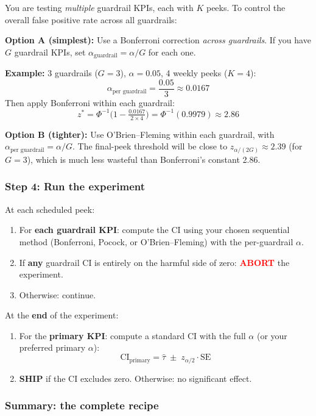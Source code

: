 \documentclass[12pt, a4paper]{article}
\begin{document}
You are testing \emph{multiple} guardrail KPIs, each with $K$ peeks.  To
control the overall false positive rate across all guardrails:

\textbf{Option A (simplest):}  Use a Bonferroni correction \emph{across
guardrails}.  If you have $G$ guardrail KPIs, set
$\alpha_{\text{guardrail}} = \alpha / G$ for each one.

\textbf{Example:} 3 guardrails ($G = 3$), $\alpha = 0.05$, 4 weekly peeks
($K = 4$):
\[
  \alpha_{\text{per guardrail}} = \frac{0.05}{3} \approx 0.0167
\]
Then apply Bonferroni within each guardrail:
\[
  z^* = \Phi^{-1}\!\bigl(1 - \tfrac{0.0167}{2 \times 4}\bigr)
  = \Phi^{-1}(0.9979) \approx 2.86
\]

\textbf{Option B (tighter):} Use O'Brien--Fleming within each guardrail,
with $\alpha_{\text{per guardrail}} = \alpha / G$.  The final-peek threshold
will be close to $z_{\alpha/(2G)} \approx 2.39$ (for $G = 3$), which is
much less wasteful than Bonferroni's constant 2.86.

\subsubsection*{Step 4: Run the experiment}

At each scheduled peek:
\begin{enumerate}[nosep]
  \item For \textbf{each guardrail KPI}: compute the CI using your chosen
        sequential method (Bonferroni, Pocock, or O'Brien--Fleming) with
        the per-guardrail $\alpha$.
  \item If \textbf{any} guardrail CI is entirely on the harmful side of
        zero: \textcolor{red}{\textbf{ABORT}} the experiment.
  \item Otherwise: continue.
\end{enumerate}

At the \textbf{end} of the experiment:
\begin{enumerate}[nosep]
  \item For the \textbf{primary KPI}: compute a standard CI with the full
        $\alpha$ (or your preferred primary $\alpha$):
        \[
          \text{CI}_{\text{primary}} = \hat{\tau} \;\pm\;
          z_{\alpha/2} \cdot \text{SE}
        \]
  \item \textcolor{green!60!black}{\textbf{SHIP}} if the CI excludes zero.
        Otherwise: no significant effect.
\end{enumerate}

\subsubsection*{Summary: the complete recipe}
\end{document}
